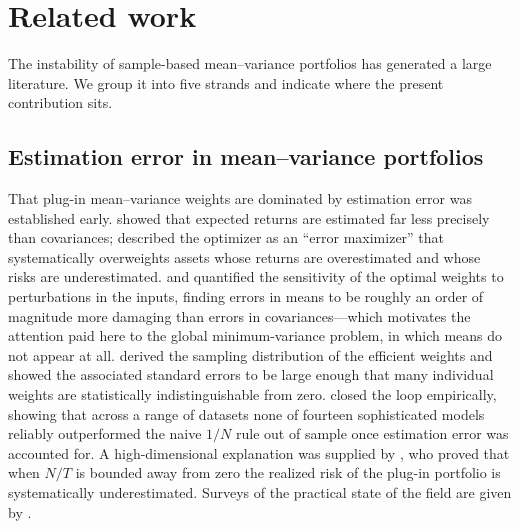\documentclass[11pt]{article}
\begin{document}
\section{Related work}
\label{sec:litreview}
The instability of sample-based mean--variance portfolios has generated a large
literature. We group it into five strands and indicate where the present
contribution sits.

\subsection{Estimation error in mean--variance portfolios}
That plug-in mean--variance weights are dominated by estimation error was
established early. \citet{merton1980} showed that expected returns are estimated
far less precisely than covariances; \citet{michaud1989} described the optimizer
as an ``error maximizer'' that systematically overweights assets whose returns
are overestimated and whose risks are underestimated. \citet{best1991} and
\citet{chopra1993} quantified the sensitivity of the optimal weights to
perturbations in the inputs, finding errors in means to be roughly an order of
magnitude more damaging than errors in covariances---which motivates the
attention paid here to the global minimum-variance problem, in which means do not
appear at all. \citet{brittenjones1999} derived the sampling distribution of the
efficient weights and showed the associated standard errors to be large enough
that many individual weights are statistically indistinguishable from zero.
\citet{demiguel2009} closed the loop empirically, showing that across a range of
datasets none of fourteen sophisticated models reliably outperformed the naive
$1/N$ rule out of sample once estimation error was accounted for. A
high-dimensional explanation was supplied by \citet{elkaroui2010}, who proved
that when $N/T$ is bounded away from zero the realized risk of the plug-in
portfolio is systematically underestimated. Surveys of the practical state of the
field are given by \citet{kolm2014}.
\end{document}
